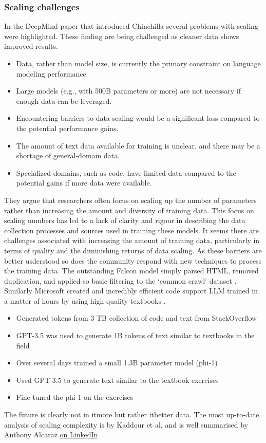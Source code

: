 \subsubsection{Scaling challenges}
In the DeepMind paper that introduced Chinchilla \cite{hoffmann2022empirical} several problems with scaling were highlighted. These finding are being challenged as cleaner data shows improved results.
\begin{itemize}
\item Data, rather than model size, is currently the primary constraint on language modeling performance.
\item Large models (e.g., with 500B parameters or more) are not necessary if enough data can be leveraged.
\item Encountering barriers to data scaling would be a significant loss compared to the potential performance gains.
\item The amount of text data available for training is unclear, and there may be a shortage of general-domain data.
\item Specialized domains, such as code, have limited data compared to the potential gains if more data were available.
\end{itemize}
They argue that researchers often focus on scaling up the number of parameters rather than increasing the amount and diversity of training data. This focus on scaling numbers has led to a lack of clarity and rigour in describing the data collection processes and sources used in training these models. It seems  there are challenges associated with increasing the amount of training data, particularly in terms of quality and the diminishing returns of data scaling. As these barriers are better usderstood so does the community respond with new techniques to process the training data. The outstanding Falcon model simply parsed HTML, removed duplication, and applied so basic filtering to the `common crawl' dataset \cite{penedo2023refinedweb}. Similarly Microsoft created and incredibly efficient code support LLM trained in a matter of hours by using high quality textbooks \cite{gunasekar2023textbooks}.
\begin{itemize}
\item Generated tokens from 3 TB collection of code and text from StackOverflow
\item GPT-3.5 was used to generate 1B tokens of text similar to textbooks in the field
\item Over several days trained a small 1.3B parameter model (phi-1)
\item Used GPT-3.5 to generate text similar to the textbook exercises
\item Fine-tuned the phi-1 on the exercises
\end{itemize} 
The future is clearly not in it{more} but rather it{better} data. The most up-to-date analysis of scaling complexity is by Kaddour et al. and is well summarised by Anthony Alcaraz \href{https://www.linkedin.com/posts/anthony-alcaraz-b80763155_this-paper-is-a-must-read-for-those-interested-activity-7087728440300158976-wa_f?}{on LinkedIn} \cite{kaddour2023challenges}
 
